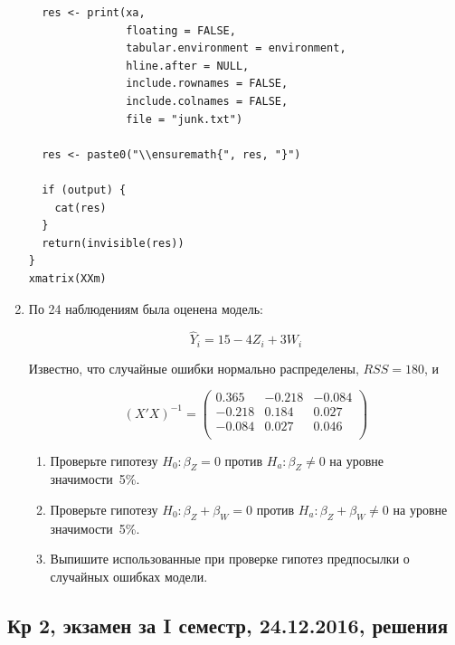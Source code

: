 \documentclass[12pt, a4paper]{article}
\begin{document}
\begin{enumerate}
\begin{verbatim}
  res <- print(xa,
               floating = FALSE,
               tabular.environment = environment,
               hline.after = NULL,
               include.rownames = FALSE,
               include.colnames = FALSE,
               file = "junk.txt")

  res <- paste0("\\ensuremath{", res, "}")

  if (output) {
    cat(res)
  }
  return(invisible(res))
}
xmatrix(XXm)
\end{verbatim}

\item По 24 наблюдениям была оценена модель:

\[
\widehat{Y}_i=15-4Z_i+3W_i
\]

Известно, что случайные ошибки нормально распределены, $RSS=180$, и

\[
(X'X)^{-1} =
\begin{pmatrix}
  0.365 & -0.218 & -0.084 \\
  -0.218 & 0.184 & 0.027 \\
  -0.084 & 0.027 & 0.046 \\
  \end{pmatrix}
\]


\begin{enumerate}
\item Проверьте гипотезу $H_0: \beta_Z = 0$ против $H_a: \beta_Z \neq 0$ на уровне значимости~5\%.
\item Проверьте гипотезу $H_0: \beta_Z + \beta_W = 0$  против $H_a: \beta_Z + \beta_W \neq 0$ на уровне значимости~5\%.
\item Выпишите использованные при проверке гипотез предпосылки о случайных ошибках модели.
\end{enumerate}


\end{enumerate}

\subsection{Кр 2, экзамен за I семестр, 24.12.2016, решения}
\end{document}

